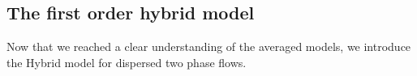 
\subsection{The first order hybrid model}

Now that we reached a clear understanding of the averaged models, we introduce the Hybrid model for dispersed two phase flows. 

